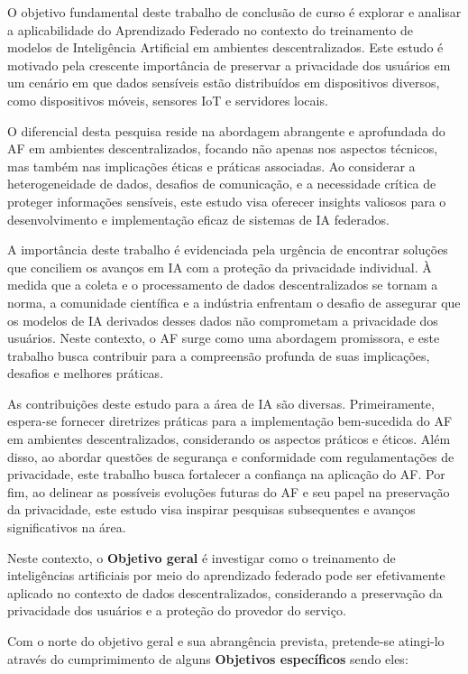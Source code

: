 O objetivo fundamental deste trabalho de conclusão de curso é explorar e analisar a aplicabilidade do Aprendizado Federado no contexto do treinamento de modelos de Inteligência Artificial em ambientes descentralizados. Este estudo é motivado pela crescente importância de preservar a privacidade dos usuários em um cenário em que dados sensíveis estão distribuídos em dispositivos diversos, como dispositivos móveis, sensores IoT e servidores locais.

O diferencial desta pesquisa reside na abordagem abrangente e aprofundada do AF em ambientes descentralizados, focando não apenas nos aspectos técnicos, mas também nas implicações éticas e práticas associadas. Ao considerar a heterogeneidade de dados, desafios de comunicação, e a necessidade crítica de proteger informações sensíveis, este estudo visa oferecer insights valiosos para o desenvolvimento e implementação eficaz de sistemas de IA federados.

A importância deste trabalho é evidenciada pela urgência de encontrar soluções que conciliem os avanços em IA com a proteção da privacidade individual. À medida que a coleta e o processamento de dados descentralizados se tornam a norma, a comunidade científica e a indústria enfrentam o desafio de assegurar que os modelos de IA derivados desses dados não comprometam a privacidade dos usuários. Neste contexto, o AF surge como uma abordagem promissora, e este trabalho busca contribuir para a compreensão profunda de suas implicações, desafios e melhores práticas.

As contribuições deste estudo para a área de IA são diversas. Primeiramente, espera-se fornecer diretrizes práticas para a implementação bem-sucedida do AF em ambientes descentralizados, considerando os aspectos práticos e éticos. Além disso, ao abordar questões de segurança e conformidade com regulamentações de privacidade, este trabalho busca fortalecer a confiança na aplicação do AF. Por fim, ao delinear as possíveis evoluções futuras do AF e seu papel na preservação da privacidade, este estudo visa inspirar pesquisas subsequentes e avanços significativos na área.

Neste contexto, o \textbf{Objetivo geral} é investigar como o treinamento de inteligências artificiais por meio do aprendizado federado pode ser efetivamente aplicado no contexto de dados descentralizados, considerando a preservação da privacidade dos usuários e a proteção do provedor do serviço. 

Com o norte do objetivo geral e sua abrangência prevista, pretende-se atingi-lo através do cumprimimento de alguns \textbf{Objetivos específicos} sendo eles: 

